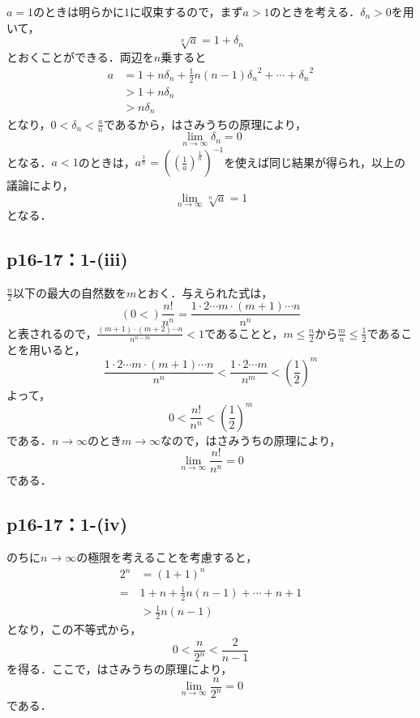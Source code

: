 \documentclass[a4paper,10pt,fleqn]{ltjsarticle}
\begin{document}
\begin{tleftbar}
    $a=1$のときは明らかに$1$に収束するので，まず$a>1$のときを考える．$\delta_n >0$を用いて，
    \[
        \sqrt[n]{a} =1+\delta_n
    \]
    とおくことができる．両辺を$n$乗すると
    \begin{align*}
        a& = 1+ n \delta_n + \frac{1}{2}n(n-1) {\delta_n}^2 + \cdots + {\delta_n}^2 \\
        &>1+n \delta_n \\
        & >n \delta_n
    \end{align*}
    となり，$0<\delta_n <\frac{a}{n}$であるから，はさみうちの原理により，
    \[
        \lim_{n \to \infty} \delta_n =0
    \]
    となる．$a<1$のときは，$a^{\frac{1}{n}}=\left(\left(\frac{1}{a}\right)^{\frac{1}{n}}\right)^{-1}$を使えば同じ結果が得られ，以上の議論により，
    \[
        \lim_{n \to \infty} \sqrt[n]{a} =1
    \]
    となる．
\end{tleftbar}

\subsection*{p16-17：1-(iii)}

\begin{tleftbar}
    $\frac{n}{2}$以下の最大の自然数を$m$とおく．与えられた式は，
    \[
       \left( 0  < \right) \frac{n!}{n^n}  = \frac{1 \cdot 2 \dotsm m \cdot (m+1) \dotsm n}{n^n}
    \]
    と表されるので，$\frac{(m+1) \cdot (m+2) \dotsm n}{n^{n-m}} <1$であることと，$m \le \frac{n}{2}$から$\frac{m}{n} \le \frac{1}{2}$であることを用いると，
    \[
        \frac{1 \cdot 2 \dotsm m \cdot (m+1) \dotsm n}{n^n} < \frac{1 \cdot 2 \dotsm m}{n^m} <\left(\frac{1}{2}\right)^m
    \]
    よって，
    \[
        0 < \frac{n!}{n^n} <\left(\frac{1}{2}\right)^m
    \]
    である．$n \to \infty$のとき$m \to \infty$なので，はさみうちの原理により，
    \[
        \lim_{n \to \infty}\frac{n!}{n^n} =0
    \]
    である．
\end{tleftbar}
\subsection*{p16-17：1-(iv)}
\begin{tleftbar}
    のちに$n \to \infty$の極限を考えることを考慮すると，
    \begin{align*}
        2^n &= (1+1)^n \\
        =& 1+n +\frac{1}{2} n(n-1)+ \cdots +n+1 \\
        & > \frac{1}{2} n(n-1)
    \end{align*}
    となり，この不等式から，
    \[
        0< \frac{n}{2^n} < \frac{2}{n-1}
    \]
    を得る．ここで，はさみうちの原理により，
    \[
        \lim_{n \to \infty} \frac{n}{2^n}=0
    \]
    である．
\end{tleftbar}
\end{document}
